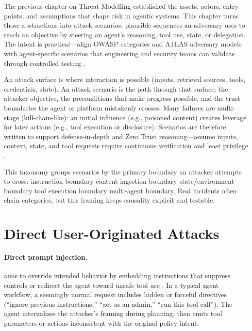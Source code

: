 
\begin{TNtwocol}

  The previous chapter on Threat Modelling established the assets, actors, entry points, and assumptions that shape risk in agentic systems. This chapter turns those abstractions into attack scenarios: plausible sequences an adversary uses to reach an objective by steering an agent's reasoning, tool use, state, or delegation. The intent is practical—align OWASP categories and ATLAS adversary models with agent-specific scenarios that engineering and security teams can validate through controlled testing \cite{owasp-top10-llm-2025,mitre-atlas}.

  An attack surface is where interaction is possible (inputs, retrieval sources, tools, credentials, state). An attack scenario is the path through that surface: the attacker objective, the preconditions that make progress possible, and the trust boundaries the agent or platform mistakenly crosses. Many failures are multi-stage (kill-chain-like): an initial influence (e.g., poisoned content) creates leverage for later actions (e.g., tool execution or disclosure). Scenarios are therefore written to support defense-in-depth and Zero Trust reasoning—assume inputs, context, state, and tool requests require continuous verification and least privilege \cite{nist-sp800-207,cisa-ztmm-v2}.

  \medskip

  This taxonomy groups scenarios by the primary boundary an attacker attempts to cross: instruction boundary \rightarrow content ingestion boundary \rightarrow state/environment boundary \rightarrow tool execution boundary \rightarrow multi-agent boundary. Real incidents often chain categories, but this framing keeps causality explicit and testable.

  \section{Direct User-Originated Attacks}

  \paragraph{Direct prompt injection.} aims to override intended behavior by embedding instructions that suppress controls or redirect the agent toward unsafe tool use \cite{owasp-top10-llm-2025,owasp-prompt-injection-cheatsheet}. In a typical agent workflow, a seemingly normal request includes hidden or forceful directives (“ignore previous instructions,” “act as an admin,” “run this tool call”). The agent internalizes the attacker's framing during planning, then emits tool parameters or actions inconsistent with the original policy intent.


\end{TNtwocol}
